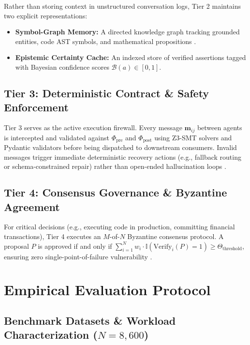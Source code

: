 \documentclass[10pt,twocolumn,letterpaper]{article}
\begin{document}
Rather than storing context in unstructured conversation logs, Tier 2 maintains two explicit representations:
\begin{itemize}
  \item \textbf{Symbol-Graph Memory:} A directed knowledge graph tracking grounded entities, code AST symbols, and mathematical propositions \cite{crossref_10_1145_3689096_3689462}.
  \item \textbf{Epistemic Certainty Cache:} An indexed store of verified assertions tagged with Bayesian confidence scores $\mathcal{B}(a) \in [0, 1]$.
\end{itemize}


\subsection{Tier 3: Deterministic Contract \& Safety Enforcement}

Tier 3 serves as the active execution firewall. Every message $\mathbf{m}_{ij}$ between agents is intercepted and validated against $\Phi_{\text{pre}}$ and $\Phi_{\text{post}}$ using Z3-SMT solvers and Pydantic validators before being dispatched to downstream consumers. Invalid messages trigger immediate deterministic recovery actions (e.g., fallback routing or schema-constrained repair) rather than open-ended hallucination loops \cite{arxiv_2404_01131}.


\subsection{Tier 4: Consensus Governance \& Byzantine Agreement}

For critical decisions (e.g., executing code in production, committing financial transactions), Tier 4 executes an $M$-of-$N$ Byzantine consensus protocol. A proposal $P$ is approved if and only if $\sum_{i=1}^N w_i \cdot \mathbb{I}(\text{Verify}_i(P) = 1) \ge \Theta_{\text{threshold}}$, ensuring zero single-point-of-failure vulnerability \cite{crossref_10_1109_access_2026_3656309}.




\section{Empirical Evaluation Protocol}



\subsection{Benchmark Datasets \& Workload Characterization ($N = 8,600$)}
\end{document}
